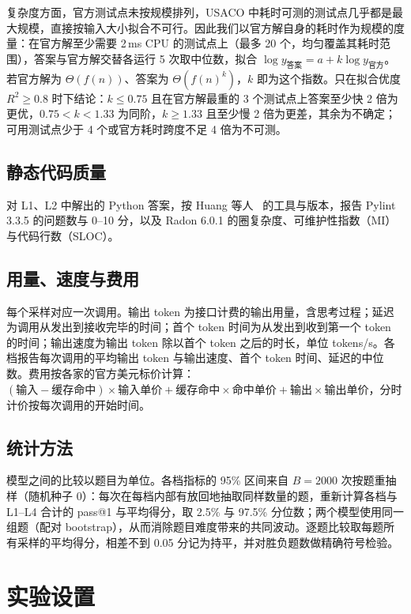 \documentclass[11pt,a4paper,fontset=none]{ctexart}
\begin{document}
复杂度方面，官方测试点未按规模排列，USACO 中耗时可测的测试点几乎都是最大规模，直接按输入大小拟合不可行。因此我们以官方解自身的耗时作为规模的度量：在官方解至少需要 2\,ms CPU 的测试点上（最多 20 个，均匀覆盖其耗时范围），答案与官方解交替各运行 5 次取中位数，拟合 $\log y_{\text{答案}} = a + k \log y_{\text{官方}}$。若官方解为 $\Theta(f(n))$、答案为 $\Theta(f(n)^k)$，$k$ 即为这个指数。只在拟合优度 $R^2 \ge 0.8$ 时下结论：$k \le 0.75$ 且在官方解最重的 3 个测试点上答案至少快 2 倍为更优，$0.75 < k < 1.33$ 为同阶，$k \ge 1.33$ 且至少慢 2 倍为更差，其余为不确定；可用测试点少于 4 个或官方耗时跨度不足 4 倍为不可测。

\subsection{静态代码质量}

对 L1、L2 中解出的 Python 答案，按 Huang 等人~\cite{staticquality} 的工具与版本，报告 Pylint 3.3.5 的问题数与 0--10 分，以及 Radon 6.0.1 的圈复杂度、可维护性指数（MI）与代码行数（SLOC）。

\subsection{用量、速度与费用}

每个采样对应一次调用。输出 token 为接口计费的输出用量，含思考过程；延迟为调用从发出到接收完毕的时间；首个 token 时间为从发出到收到第一个 token 的时间；输出速度为输出 token 除以首个 token 之后的时长，单位 tokens/s。各档报告每次调用的平均输出 token 与输出速度、首个 token 时间、延迟的中位数。费用按各家的官方美元标价计算：$(\text{输入} - \text{缓存命中}) \times \text{输入单价} + \text{缓存命中} \times \text{命中单价} + \text{输出} \times \text{输出单价}$，分时计价按每次调用的开始时间。

\subsection{统计方法}

模型之间的比较以题目为单位。各档指标的 95\% 区间来自 $B = 2000$ 次按题重抽样（随机种子 0）：每次在每档内部有放回地抽取同样数量的题，重新计算各档与 L1--L4 合计的 pass@1 与平均得分，取 2.5\% 与 97.5\% 分位数；两个模型使用同一组题（配对 bootstrap），从而消除题目难度带来的共同波动。逐题比较取每题所有采样的平均得分，相差不到 0.05 分记为持平，并对胜负题数做精确符号检验。

\section{实验设置}
\end{document}
